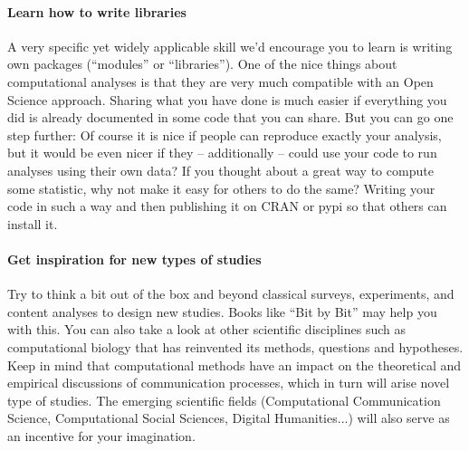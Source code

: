 \paragraph{Learn how to write libraries} A very specific yet widely applicable skill we'd encourage you to learn is writing own packages (``modules'' or ``libraries''). One of the nice things about computational analyses is that they are very much compatible with an Open Science approach. Sharing what you have done is much easier if everything you did is already documented in some code that you can share. But you can go one step further: Of course it is nice if people can reproduce exactly your analysis, but it would be even nicer if they -- additionally -- could use your code to run analyses using their own data? If you thought about a great way to compute some statistic, why not make it easy for others to do the same? Writing your code in such a way and then publishing it on CRAN or pypi so that others can install it.

\paragraph{Get inspiration for new types of studies} Try to think a bit out of the box and beyond classical surveys, experiments, and content analyses to design new studies. Books like ``Bit by Bit'' \cite{Salganik2019} may help you with this. You can also take a look at other scientific disciplines such as computational biology that has reinvented its methods, questions and hypotheses. Keep in mind that computational methods have an impact on the theoretical and empirical discussions of communication processes, which in turn will arise novel type of studies. The emerging scientific fields (Computational Communication Science, Computational Social Sciences, Digital Humanities...) will also serve as an incentive for your imagination.

